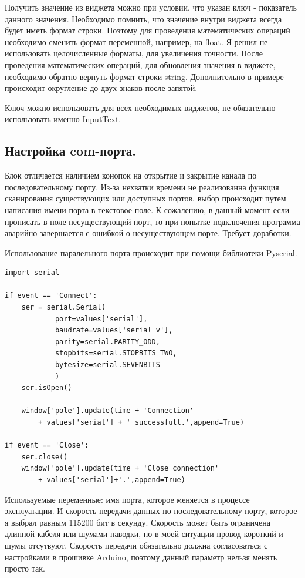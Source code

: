 Получить значение из виджета можно при условии, что указан ключ - показатель данного значения. Необходимо помнить, что значение внутри виджета всегда будет иметь формат строки. Поэтому для проведения математических операций необходимо сменить формат переменной, например, на float. Я решил не использовать целочисленные форматы, для увеличения точности. После проведения математических операций, для обновления значения в виджете, необходимо обратно вернуть формат строки string. Дополнительно в примере происходит округление до двух знаков после запятой.

Ключ можно использовать для всех необходимых виджетов, не обязательно использовать именно InputText.

\subsection{Настройка com-порта.}
Блок отличается наличием конопок на открытие и закрытие канала по последовательному порту. Из-за нехватки времени не реализованна функция сканирования существующих или доступных портов, выбор происходит путем написания имени порта в текстовое поле. К сожалению, в данный момент если прописать в поле несуществующий порт, то при попытке подключения программа аварийно завершается с ошибкой о несуществующем порте. Требует доработки.

Использование паралельного порта происходит при помощи библиотеки Pyserial.

\begin{lstlisting}[style=python,caption=Пример использования Pyserial]
import serial

if event == 'Connect':
    ser = serial.Serial(
            port=values['serial'],
            baudrate=values['serial_v'],
            parity=serial.PARITY_ODD,
            stopbits=serial.STOPBITS_TWO,
            bytesize=serial.SEVENBITS
            )
    ser.isOpen()

    window['pole'].update(time + 'Connection'
        + values['serial'] + ' successfull.',append=True)

if event == 'Close':
    ser.close()
    window['pole'].update(time + 'Close connection'
        + values['serial']+'.',append=True)

\end{lstlisting}

Используемые переменные: имя порта, которое меняется в процессе эксплуатации. И скорость передачи данных по последовательному порту, которое я выбрал равным 115200 бит в секунду. Скорость может быть ограничена длинной кабеля или шумами наводки, но в моей ситуации провод короткий и шумы отсутвуют. Скорость передачи обязательно должна согласоваться с настройками в прошивке Arduino, поэтому данный параметр нельзя менять просто так.


